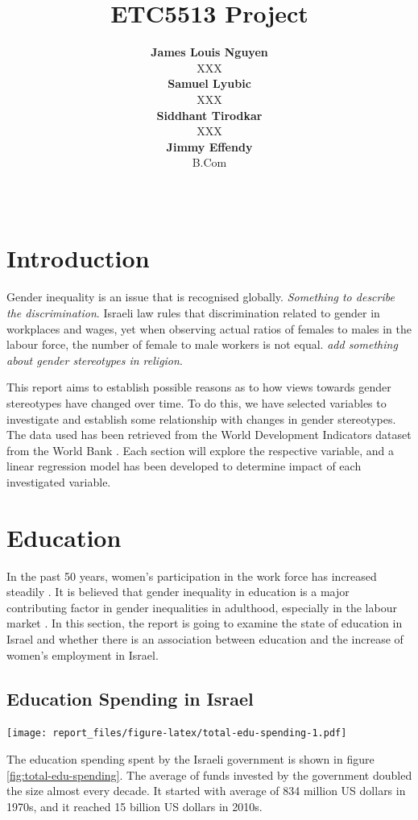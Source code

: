 \documentclass[11pt,a4paper,]{article}
\title{ETC5513 Project}
\author{\sf\Large\textbf{ James Louis Nguyen}\\ {\sf\large XXX\\[0.5cm]} \sf\Large\textbf{ Samuel Lyubic}\\ {\sf\large XXX\\[0.5cm]} \sf\Large\textbf{ Siddhant Tirodkar}\\ {\sf\large XXX\\[0.5cm]} \sf\Large\textbf{ Jimmy Effendy}\\ {\sf\large B.Com\\[0.5cm]}}
\date{\sf\Date~\Month~\Year}
\makeatletter
\def\titlepage{\front{\expandafter{\@title}}{\@author}{\@organization}}
\let\origfigure\figure
\let\endorigfigure\endfigure
\renewenvironment{figure}[1][2] {
    \expandafter\origfigure\expandafter[H]
} {
    \endorigfigure
}%
\makeatother
\begin{document}
\titlepage

\section*{Introduction}

Gender inequality is an issue that is recognised globally.
\emph{Something to describe the discrimination}. Israeli law rules that
discrimination related to gender in workplaces and wages, yet when
observing actual ratios of females to males in the labour force, the
number of female to male workers is not equal. \emph{add something about
gender stereotypes in religion}.

This report aims to establish possible reasons as to how views towards
gender stereotypes have changed over time. To do this, we have selected
variables to investigate and establish some relationship with changes in
gender stereotypes. The data used has been retrieved from the World
Development Indicators dataset from the World Bank
\textcite{TheWorldBank2020}. Each section will explore the respective
variable, and a linear regression model has been developed to determine
impact of each investigated variable.

\section*{Education}

In the past 50 years, women's participation in the work force has
increased steadily \autocite{stier2000women}. It is believed that gender
inequality in education is a major contributing factor in gender
inequalities in adulthood, especially in the labour market
\autocite{marks2008accounting}. In this section, the report is going to
examine the state of education in Israel and whether there is an
association between education and the increase of women's employment in
Israel.

\subsection*{Education Spending in Israel}

\begin{figure}
\centering
\texttt{[image: report\_files/figure-latex/total-edu-spending-1.pdf]}
\caption{\label{fig:total-edu-spending}Average Education Expenditure in
Israel by Decades}
\end{figure}

The education spending spent by the Israeli government is shown in
figure \ref{fig:total-edu-spending}. The average of funds invested by
the government doubled the size almost every decade. It started with
average of 834 million US dollars in 1970s, and it reached 15 billion US
dollars in 2010s.
\end{document}
